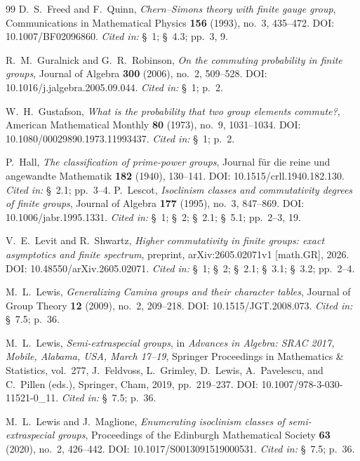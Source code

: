 \documentclass[11pt]{article}
\theoremstyle{definition}
\theoremstyle{remark}
\theoremstyle{definition}
\theoremstyle{plain}
\newcommand{\citedin}[1]{\newblock \emph{Cited in:} #1.}
\begin{document}
\begin{thebibliography}{99}
D.~S.~Freed and F.~Quinn,
\newblock \emph{Chern--Simons theory with finite gauge group},
\newblock Communications in Mathematical Physics \textbf{156} (1993), no.~3, 435--472.
\newblock DOI: 10.1007/BF02096860.
\citedin{\S~1; \S~4.3; pp.~3, 9}

R.~M.~Guralnick and G.~R.~Robinson,
\newblock \emph{On the commuting probability in finite groups},
\newblock Journal of Algebra \textbf{300} (2006), no.~2, 509--528.
\newblock DOI: 10.1016/j.jalgebra.2005.09.044.
\citedin{\S~1; p.~2}

W.~H.~Gustafson,
\newblock \emph{What is the probability that two group elements commute?},
\newblock American Mathematical Monthly \textbf{80} (1973), no.~9, 1031--1034.
\newblock DOI: 10.1080/00029890.1973.11993437.
\citedin{\S~1; p.~2}

P.~Hall,
\newblock \emph{The classification of prime-power groups},
\newblock Journal f\"ur die reine und angewandte Mathematik \textbf{182} (1940), 130--141.
\newblock DOI: 10.1515/crll.1940.182.130.
\citedin{\S~2.1; pp.~3--4}
P.~Lescot,
\newblock \emph{Isoclinism classes and commutativity degrees of finite groups},
\newblock Journal of Algebra \textbf{177} (1995), no.~3, 847--869.
\newblock DOI: 10.1006/jabr.1995.1331.
\citedin{\S~1; \S~2; \S~2.1; \S~5.1; pp.~2--3, 19}

V.~E.~Levit and R.~Shwartz,
\newblock \emph{Higher commutativity in finite groups: exact asymptotics and finite spectrum},
\newblock preprint, arXiv:2605.02071v1 [math.GR], 2026.
\newblock DOI: 10.48550/arXiv.2605.02071.
\citedin{\S~1; \S~2; \S~2.1; \S~3.1; \S~3.2; pp.~2--4}


M.~L.~Lewis,
\newblock \emph{Generalizing Camina groups and their character tables},
\newblock Journal of Group Theory \textbf{12} (2009), no.~2, 209--218.
\newblock DOI: 10.1515/JGT.2008.073.
\citedin{\S~7.5; p.~36}

M.~L.~Lewis,
\newblock \emph{Semi-extraspecial groups},
\newblock in \emph{Advances in Algebra: SRAC 2017, Mobile, Alabama, USA, March 17--19},
\newblock Springer Proceedings in Mathematics \& Statistics, vol.~277,
\newblock J.~Feldvoss, L.~Grimley, D.~Lewis, A.~Pavelescu, and C.~Pillen (eds.),
\newblock Springer, Cham, 2019, pp.~219--237.
\newblock DOI: 10.1007/978-3-030-11521-0\_11.
\citedin{\S~7.5; p.~36}

M.~L.~Lewis and J.~Maglione,
\newblock \emph{Enumerating isoclinism classes of semi-extraspecial groups},
\newblock Proceedings of the Edinburgh Mathematical Society \textbf{63} (2020), no.~2, 426--442.
\newblock DOI: 10.1017/S0013091519000531.
\citedin{\S~7.5; p.~36}


\end{thebibliography}
\end{document}
